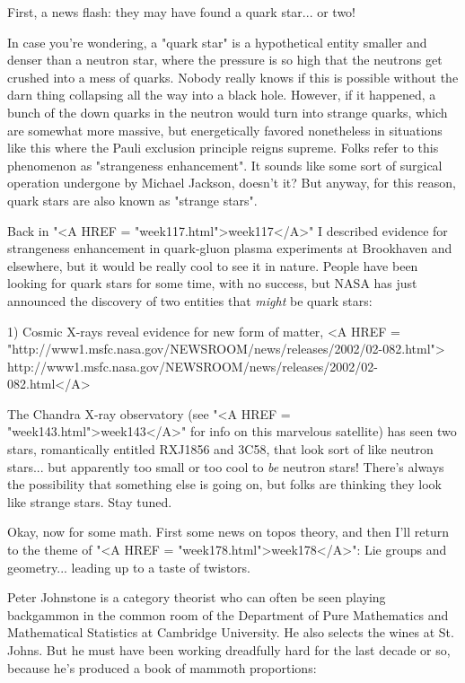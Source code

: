 

First, a news flash: they may have found a quark star... or two!

In case you're wondering, a "quark star" is a hypothetical entity 
smaller and denser than a neutron star, where the pressure is so 
high that the neutrons get crushed into a mess of quarks.  Nobody 
really knows if this is possible without the darn thing collapsing 
all the way into a black hole.  However, if it happened, a bunch 
of the down quarks in the neutron would turn into strange quarks, 
which are somewhat more massive, but energetically favored nonetheless 
in situations like this where the Pauli exclusion principle reigns 
supreme.  Folks refer to this phenomenon as "strangeness enhancement".
It sounds like some sort of surgical operation undergone by Michael
Jackson, doesn't it?   But anyway, for this reason, quark stars are 
also known as "strange stars".  

Back in "<A HREF = "week117.html">week117</A>" I described evidence 
for strangeness enhancement
in quark-gluon plasma experiments at Brookhaven and elsewhere, 
but it would be really cool to see it in nature.   People have been 
looking for quark stars for some time, with no success, but NASA
has just announced the discovery of two entities that \emph{might} be 
quark stars:

1) Cosmic X-rays reveal evidence for new form of matter, 
<A HREF = "http://www1.msfc.nasa.gov/NEWSROOM/news/releases/2002/02-082.html">
http://www1.msfc.nasa.gov/NEWSROOM/news/releases/2002/02-082.html</A>


The Chandra X-ray observatory (see "<A HREF = "week143.html">week143</A>" for info on this marvelous
satellite) has seen two stars, romantically entitled RXJ1856 and 3C58, 
that look sort of like neutron stars... but apparently too small or 
too cool to \emph{be} neutron stars!  There's always the possibility that 
something else is going on, but folks are thinking they look like 
strange stars.  Stay tuned.

Okay, now for some math.  First some news on topos theory, and then I'll 
return to the theme of "<A HREF = "week178.html">week178</A>": Lie 
groups and geometry... leading up to a taste of twistors. 

Peter Johnstone is a category theorist who can often be seen playing
backgammon in the common room of the Department of Pure Mathematics and
Mathematical Statistics at Cambridge University.  He also selects the
wines at St. Johns.  But he must have been working dreadfully hard for
the last decade or so, because he's produced a book of mammoth proportions:

